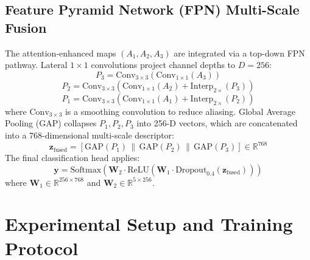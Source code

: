 \documentclass[conference]{IEEEtran}
\begin{document}
\subsection{Feature Pyramid Network (FPN) Multi-Scale Fusion}
The attention-enhanced maps $(A_1, A_2, A_3)$ are integrated via a top-down FPN pathway. Lateral $1 \times 1$ convolutions project channel depths to $D=256$:
\begin{equation}
P_3 = \text{Conv}_{3 \times 3}\left(\text{Conv}_{1 \times 1}(A_3)\right)
\end{equation}
\begin{equation}
P_2 = \text{Conv}_{3 \times 3}\left(\text{Conv}_{1 \times 1}(A_2) + \text{Interp}_{2\times}(P_3)\right)
\end{equation}
\begin{equation}
P_1 = \text{Conv}_{3 \times 3}\left(\text{Conv}_{1 \times 1}(A_1) + \text{Interp}_{2\times}(P_2)\right)
\end{equation}
where $\text{Conv}_{3 \times 3}$ is a smoothing convolution to reduce aliasing. Global Average Pooling (GAP) collapses $P_1, P_2, P_3$ into 256-D vectors, which are concatenated into a $768$-dimensional multi-scale descriptor:
\begin{equation}
\mathbf{z}_{\text{fused}} = [\text{GAP}(P_1) \,\|\, \text{GAP}(P_2) \,\|\, \text{GAP}(P_3)] \in \mathbb{R}^{768}
\end{equation}
The final classification head applies:
$$\mathbf{y} = \text{Softmax}\left(\mathbf{W}_2 \cdot \text{ReLU}\left(\mathbf{W}_1 \cdot \text{Dropout}_{0.4}(\mathbf{z}_{\text{fused}})\right)\right)$$
where $\mathbf{W}_1 \in \mathbb{R}^{256 \times 768}$ and $\mathbf{W}_2 \in \mathbb{R}^{5 \times 256}$.

\section{Experimental Setup and Training Protocol}
\end{document}

